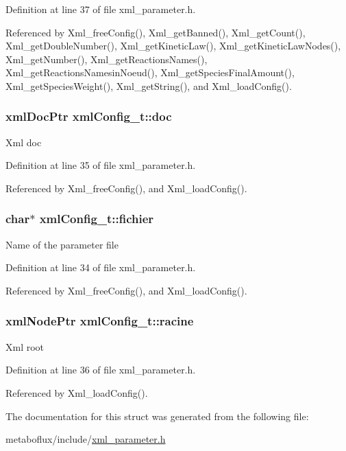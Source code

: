 Definition at line 37 of file xml\_\-parameter.h.



Referenced by Xml\_\-freeConfig(), Xml\_\-getBanned(), Xml\_\-getCount(), Xml\_\-getDoubleNumber(), Xml\_\-getKineticLaw(), Xml\_\-getKineticLawNodes(), Xml\_\-getNumber(), Xml\_\-getReactionsNames(), Xml\_\-getReactionsNamesinNoeud(), Xml\_\-getSpeciesFinalAmount(), Xml\_\-getSpeciesWeight(), Xml\_\-getString(), and Xml\_\-loadConfig().

\hypertarget{structxmlConfig__t_a35e7e8fc3398d0866fbf91b0245fd7b9}{
\subsubsection[{doc}]{\setlength{\rightskip}{0pt plus 5cm}xmlDocPtr {\bf xmlConfig\_\-t::doc}}}
\label{structxmlConfig__t_a35e7e8fc3398d0866fbf91b0245fd7b9}
Xml doc 

Definition at line 35 of file xml\_\-parameter.h.



Referenced by Xml\_\-freeConfig(), and Xml\_\-loadConfig().

\hypertarget{structxmlConfig__t_a7a2f1cbf9d3b49f1b2debb85a8606658}{
\subsubsection[{fichier}]{\setlength{\rightskip}{0pt plus 5cm}char$\ast$ {\bf xmlConfig\_\-t::fichier}}}
\label{structxmlConfig__t_a7a2f1cbf9d3b49f1b2debb85a8606658}
Name of the parameter file 

Definition at line 34 of file xml\_\-parameter.h.



Referenced by Xml\_\-freeConfig(), and Xml\_\-loadConfig().

\hypertarget{structxmlConfig__t_a535cd8a3e33d4ae2a00ab29f32a442ff}{
\subsubsection[{racine}]{\setlength{\rightskip}{0pt plus 5cm}xmlNodePtr {\bf xmlConfig\_\-t::racine}}}
\label{structxmlConfig__t_a535cd8a3e33d4ae2a00ab29f32a442ff}
Xml root 

Definition at line 36 of file xml\_\-parameter.h.



Referenced by Xml\_\-loadConfig().



The documentation for this struct was generated from the following file:\begin{DoxyCompactItemize}
\item 
metaboflux/include/\hyperlink{xml__parameter_8h}{xml\_\-parameter.h}\end{DoxyCompactItemize}
